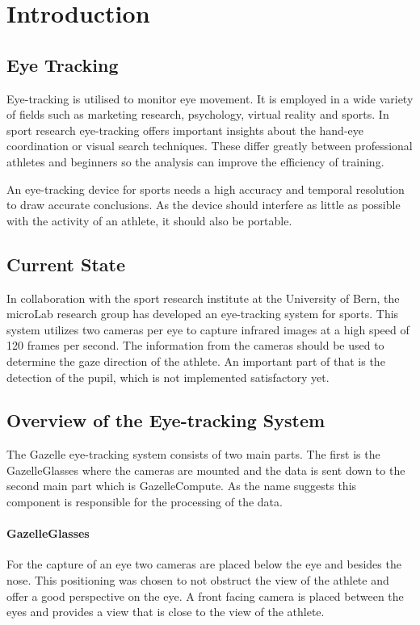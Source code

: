 \chapter{Introduction}

\label{chap:introduction}
\section{Eye Tracking}
Eye-tracking is utilised to monitor eye movement. It is employed in a wide variety of fields such as marketing research, psychology, virtual reality and sports. In sport research eye-tracking offers important insights about the hand-eye coordination or visual search techniques. These differ greatly between professional athletes and beginners so the analysis can improve the efficiency of training. 

An eye-tracking device for sports needs a high accuracy and temporal resolution to draw accurate conclusions. As the device should interfere as little as possible with the activity of an athlete, it should also be portable.

\section{Current State}
In collaboration with the sport research institute at the University of Bern, the microLab research group has developed an eye-tracking system for sports. This system utilizes two cameras per eye to capture infrared images at a high speed of 120 frames per second. The information from the cameras should be used to determine the gaze direction of the athlete. An important part of that is the detection of the pupil, which is not implemented satisfactory yet.

\section{Overview of the Eye-tracking System}
The Gazelle eye-tracking system consists of two main parts. The first is the GazelleGlasses where the cameras are mounted and the data is sent down to the second main part which is GazelleCompute. As the name suggests this component is responsible for the processing of the data.

\subsubsection{GazelleGlasses}
For the capture of an eye two cameras are placed below the eye and besides the nose. This positioning was chosen to not obstruct the view of the athlete and offer a good perspective on the eye. A front facing camera is placed between the eyes and provides a view that is close to the view of the athlete.

